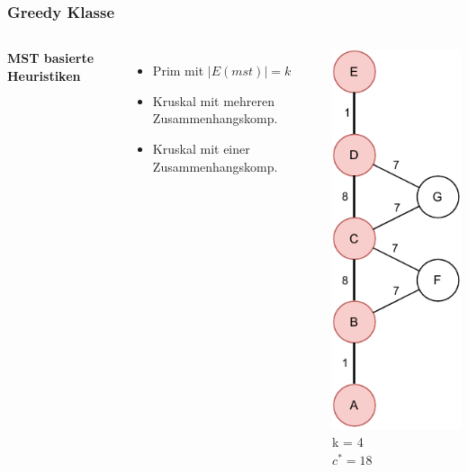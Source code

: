 \documentclass[aspectratio=169]{beamer}
\begin{document}
\begin{frame}
	\frametitle{Greedy Klasse}
	\begin{columns}[c] %
		
		\textbf{MST basierte Heuristiken}
		\begin{itemize}
			\item Prim mit $|E(mst)| = k$
			\item Kruskal mit mehreren Zusammenhangskomp.
			\item Kruskal mit einer Zusammenhangskomp.
		\end{itemize}
		\includegraphics[scale=.6]{greedy_optimal.pdf}
		k = 4\\
		$c^* = 18$
		
		
	\end{columns}
	\end{frame}
	
\end{document}
